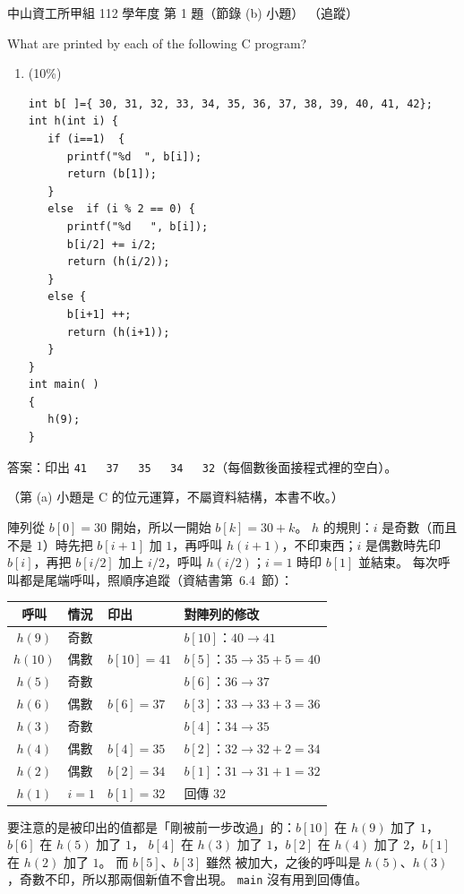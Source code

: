 \begin{pastexam}[label={px:nsysu-112-osds-01}]{中山資工所甲組 112 學年度 第 1 題（節錄 (b) 小題）}
（追蹤）

What are printed by each of the following C program?
\begin{enumerate}[label=(\alph*), start=2]
\item (10\%)
\begin{verbatim}
int b[ ]={ 30, 31, 32, 33, 34, 35, 36, 37, 38, 39, 40, 41, 42};
int h(int i) {
   if (i==1)  {
      printf("%d  ", b[i]);
      return (b[1]);
   }
   else  if (i % 2 == 0) {
      printf("%d   ", b[i]);
      b[i/2] += i/2;
      return (h(i/2));
   }
   else {
      b[i+1] ++;
      return (h(i+1));
   }
}
int main( )
{
   h(9);
}
\end{verbatim}
\end{enumerate}
\end{pastexam}

\begin{pastsoln}
答案：印出 \texttt{41~~~37~~~35~~~34~~~32}（每個數後面接程式裡的空白）。

（第 (a) 小題是 C 的位元運算，不屬資料結構，本書不收。）

陣列從 $b[0] = 30$ 開始，所以一開始 $b[k] = 30 + k$。 $h$ 的規則：$i$ 是奇數（而且不是 $1$）時先把
$b[i+1]$ 加 $1$，再呼叫 $h(i+1)$，不印東西；$i$ 是偶數時先印 $b[i]$，再把 $b[i/2]$ 加上 $i/2$，呼叫
$h(i/2)$；$i = 1$ 時印 $b[1]$ 並結束。 每次呼叫都是尾端呼叫，照順序追蹤（資結書第~6.4~節）：
\begin{center}
\small
\begin{tabular}{clll}
\toprule
呼叫 & 情況 & 印出 & 對陣列的修改 \\
\midrule
$h(9)$ & 奇數 & & $b[10]$：$40 \to 41$ \\
$h(10)$ & 偶數 & $b[10] = 41$ & $b[5]$：$35 \to 35 + 5 = 40$ \\
$h(5)$ & 奇數 & & $b[6]$：$36 \to 37$ \\
$h(6)$ & 偶數 & $b[6] = 37$ & $b[3]$：$33 \to 33 + 3 = 36$ \\
$h(3)$ & 奇數 & & $b[4]$：$34 \to 35$ \\
$h(4)$ & 偶數 & $b[4] = 35$ & $b[2]$：$32 \to 32 + 2 = 34$ \\
$h(2)$ & 偶數 & $b[2] = 34$ & $b[1]$：$31 \to 31 + 1 = 32$ \\
$h(1)$ & $i = 1$ & $b[1] = 32$ & 回傳 $32$ \\
\bottomrule
\end{tabular}
\end{center}
要注意的是被印出的值都是「剛被前一步改過」的：$b[10]$ 在 $h(9)$ 加了 $1$，$b[6]$ 在 $h(5)$ 加了 $1$，
$b[4]$ 在 $h(3)$ 加了 $1$，$b[2]$ 在 $h(4)$ 加了 $2$，$b[1]$ 在 $h(2)$ 加了 $1$。 而 $b[5]$、$b[3]$ 雖然
被加大，之後的呼叫是 $h(5)$、$h(3)$，奇數不印，所以那兩個新值不會出現。 \texttt{main} 沒有用到回傳值。
\end{pastsoln}
